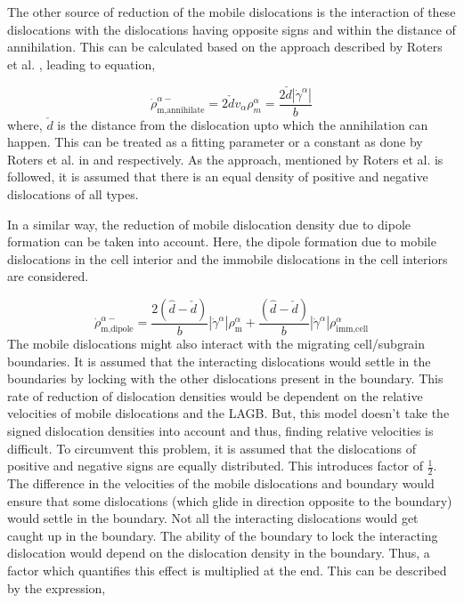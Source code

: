 \documentclass[a4paper,11pt]{article}
\begin{document}
The other source of reduction of the mobile dislocations is the interaction of these dislocations with the dislocations having opposite signs and within the distance of annihilation. 
This can be calculated based on the approach described by Roters et al. \cite{Roters2000}, leading to equation,

\begin{equation}
\dot\rho_{\text{m,annihilate}}^{\alpha-} = 2\check{d} v_\alpha \rho_m^\alpha = \frac{2\check{d}\left|\dot\gamma^\alpha\right|}{b} \label{eq:9}
\end{equation}
%
where, \begin{math} \check{d} \end{math} is the distance from the dislocation upto which the annihilation can happen. This can be treated as a fitting parameter or a constant as done by Roters et al. in
\cite{Roters2000} and \cite{Roters2017} respectively. As the approach, mentioned by Roters et al. \cite{Roters2000} is followed, it is assumed that there is an equal density of positive and negative dislocations of all types.   

In a similar way, the reduction of mobile dislocation density due to dipole formation can be taken into account. 
Here, the dipole formation due to mobile dislocations in the cell interior and the immobile dislocations in the cell interiors are considered.

\begin{equation}
\dot\rho_{\text{m,dipole}}^{\alpha-} = \frac{2\left(\hat{d} - \check{d}\right)}{b} \left|\dot\gamma^\alpha\right| \rho_{\text{m}}^\alpha + \frac{\left(\hat{d} - \check{d}\right)}{b} \left|\dot\gamma^\alpha\right| \rho_{\text{imm,cell}}^\alpha \label{eq:10}
\end{equation}
%
The mobile dislocations might also interact with the migrating cell/subgrain boundaries. 
It is assumed that the interacting dislocations would settle in the boundaries by locking with the other dislocations present in the boundary. 
This rate of reduction of dislocation densities would be dependent on the relative velocities of mobile dislocations and the LAGB. 
But, this model doesn’t take the signed dislocation densities into account and thus, finding relative velocities is difficult. 
To circumvent this problem, it is assumed that the dislocations of positive and negative signs are equally distributed. 
This introduces factor of \begin{math} \frac{1}{2} \end{math}.
The difference in the velocities of the mobile dislocations and boundary would ensure that some dislocations (which glide in direction opposite to the boundary) would settle in the boundary. 
Not all the interacting dislocations would get caught up in the boundary. 
The ability of the boundary to lock the interacting dislocation would depend on the dislocation density in the boundary. 
Thus, a factor which quantifies this effect is multiplied at the end. 
This can be described by the expression,
\end{document}
